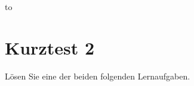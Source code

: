 %
%
%



{\parindent0pt\hbox to}
\vspace{0.5cm}

\section*{Kurztest 2}
Lösen Sie eine der beiden folgenden Lernaufgaben.

\begin{uebungsaufgaben}



\end{uebungsaufgaben}


